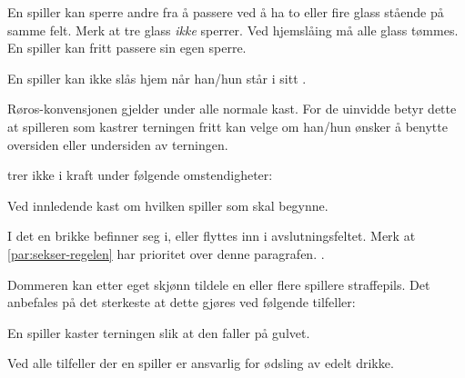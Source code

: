 \begin{ludol}
\item \label{par:sperre} En spiller kan sperre andre fra å passere ved å ha to
  eller fire glass stående på samme felt. Merk at tre glass \emph{ikke} sperrer.
  Ved hjemslåing må alle glass tømmes. En spiller kan fritt passere sin egen
  sperre.

\item En spiller kan ikke slås hjem når han/hun står i sitt
  .

\item \label{par:roros} Røros-konvensjonen gjelder under alle normale kast. For
  de uinvidde betyr dette at spilleren som kastrer terningen fritt kan velge om
  han/hun ønsker å benytte oversiden eller undersiden av terningen.


 \ifnothandbok{\newpage %
  \vspace*{-1.38cm}} \thispagestyle{empty} %

\item \label{par:roros-2}  trer ikke i kraft under følgende
  omstendigheter:

  \begin{ludol}

  \item Ved innledende kast om hvilken spiller som skal begynne.

  \item I det en brikke befinner seg i, eller flyttes inn i avslutningsfeltet.
    Merk at \cref{par:sekser-regelen} har prioritet over denne paragrafen.
    .

  \end{ludol}

\item Dommeren kan etter eget skjønn tildele en eller flere spillere
  straffepils. Det anbefales på det sterkeste at dette gjøres ved følgende
  tilfeller:

  \begin{ludol}

  \item En spiller kaster terningen slik at den faller på gulvet.

  \item Ved alle tilfeller der en spiller er ansvarlig for ødsling av edelt
    drikke.


\end{ludol}
\end{ludol}
